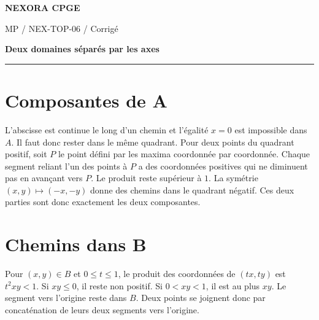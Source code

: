 \documentclass[11pt,a4paper]{article}
\begin{document}
{\small\bfseries\color{nexorablue} NEXORA CPGE}\par
{\small MP / NEX-TOP-06 / Corrigé}\par
{\LARGE\bfseries Deux domaines séparés par les axes}\par
\vspace{0.25em}\hrule\vspace{0.6em}

\section*{Composantes de A}
L’abscisse est continue le long d’un chemin et l’égalité $x=0$ est impossible dans $A$. Il faut donc rester dans le même quadrant. Pour deux points du quadrant positif, soit $P$ le point défini par les maxima coordonnée par coordonnée. Chaque segment reliant l’un des points à $P$ a des coordonnées positives qui ne diminuent pas en avançant vers $P$. Le produit reste supérieur à $1$. La symétrie $(x,y)\mapsto(-x,-y)$ donne des chemins dans le quadrant négatif. Ces deux parties sont donc exactement les deux composantes.

\section*{Chemins dans B}
Pour $(x,y)\in B$ et $0\le t\le1$, le produit des coordonnées de $(tx,ty)$ est $t^2xy<1$. Si $xy\le0$, il reste non positif. Si $0<xy<1$, il est au plus $xy$. Le segment vers l’origine reste dans $B$. Deux points se joignent donc par concaténation de leurs deux segments vers l’origine.
\end{document}
